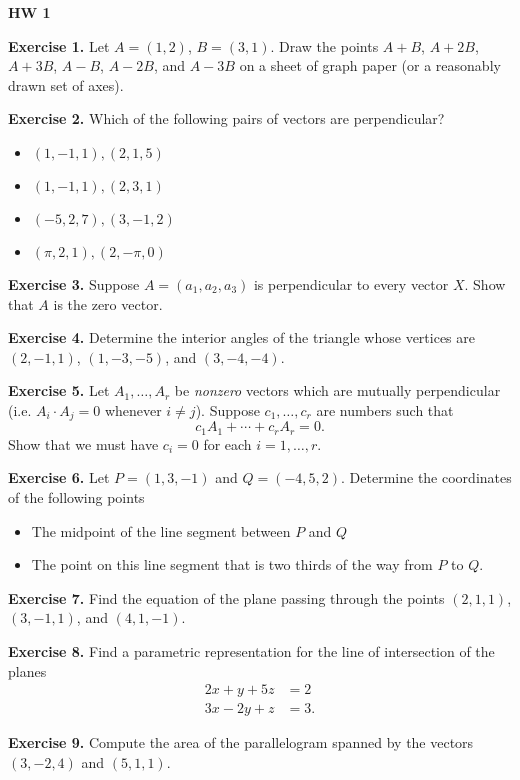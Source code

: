 \documentclass{article}
\begin{document}

\textbf{HW 1}

\textbf{Exercise 1.}
 Let $A = (1,2)$, $B = (3,1)$. Draw the points $A+B$, $A+2B$, $A+3B$, $A-B$, $A-2B$, and $A - 3B$
 on a sheet of graph paper (or a reasonably drawn set of axes).

\textbf{Exercise 2.} Which of the following pairs of vectors are perpendicular?
\begin{itemize}
    \item $(1,-1,1), (2,1,5)$ 
    \item $(1,-1,1), (2,3,1)$ 
    \item $(-5,2,7), (3,-1,2)$
    \item $(\pi,2,1), (2,-\pi,0)$
\end{itemize}

\textbf{Exercise 3.}
Suppose $A = (a_1,a_2,a_3)$ is perpendicular to every vector $X$. Show that
$A$ is the zero vector.

\textbf{Exercise 4.}  Determine the interior angles of the triangle whose vertices are 
$(2, -1, 1)$, $(1, - 3, - 5)$, and $(3, -4, -4)$.

\textbf{Exercise 5.} Let $A_1, \ldots, A_r$ be \emph{nonzero} vectors which are mutually perpendicular
(i.e. $A_i \cdot A_j = 0$ whenever $i \neq j$). Suppose $c_1, \ldots, c_r$ are numbers such that
\[c_1 A_1 + \cdots + c_r A_r = 0.\]
Show that we must have $c_i = 0$ for each $i=1,\ldots, r$.

\textbf{Exercise 6.} Let $P = (1,3, -1)$ and $Q = (-4,5,2)$. 
Determine the coordinates of the following points
\begin{itemize}
    \item The midpoint of the line segment between $P$ and $Q$
    \item The point on this line segment that is two thirds of the way from $P$ to $Q$.
\end{itemize}

\textbf{Exercise 7.} Find the equation of the plane passing through the points
$(2,1,1)$, $(3,-1,1)$, and $(4,1,-1)$.

\textbf{Exercise 8.} Find a parametric representation for the
line of intersection of the planes 
\begin{align*}
    2x + y + 5z &= 2\\
    3x - 2y + z &= 3.
\end{align*}

\textbf{Exercise 9.} Compute the area of the parallelogram spanned
by the vectors $(3,-2,4)$ and $(5,1,1)$.

\end{document}
